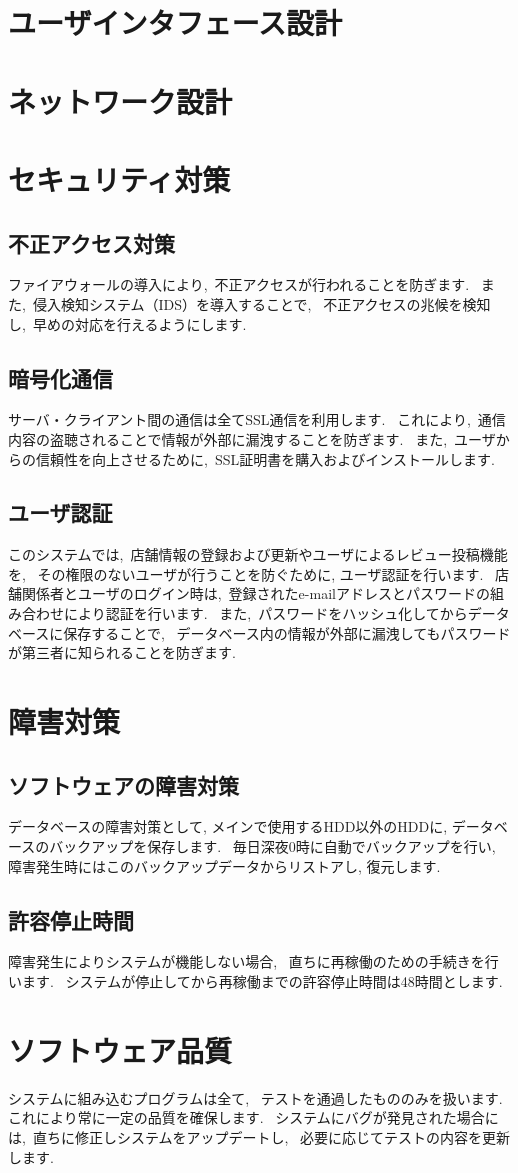\documentclass[a4j,titlepage]{jarticle}
\begin{document}
\section{ユーザインタフェース設計}

\section{ネットワーク設計}

\section{セキュリティ対策}
\subsection{不正アクセス対策}
ファイアウォールの導入により,~不正アクセスが行われることを防ぎます.~
また,~侵入検知システム（IDS）を導入することで,~
不正アクセスの兆候を検知し,~早めの対応を行えるようにします.~
\subsection{暗号化通信}
サーバ・クライアント間の通信は全てSSL通信を利用します.~
これにより,~通信内容の盗聴されることで情報が外部に漏洩することを防ぎます.~
また,~ユーザからの信頼性を向上させるために,~SSL証明書を購入およびインストールします.~
\subsection{ユーザ認証}
このシステムでは,~店舗情報の登録および更新やユーザによるレビュー投稿機能を,~
その権限のないユーザが行うことを防ぐために, ユーザ認証を行います.~
店舗関係者とユーザのログイン時は,~登録されたe-mailアドレスとパスワードの組み合わせにより認証を行います.~
また,~パスワードをハッシュ化してからデータベースに保存することで,~
データベース内の情報が外部に漏洩してもパスワードが第三者に知られることを防ぎます.~


\section{障害対策}
\subsection{ソフトウェアの障害対策}
データベースの障害対策として, メインで使用するHDD以外のHDDに,
データベースのバックアップを保存します.~
毎日深夜0時に自動でバックアップを行い,
障害発生時にはこのバックアップデータからリストアし, 復元します.~
\subsection{許容停止時間}
障害発生によりシステムが機能しない場合,~
直ちに再稼働のための手続きを行います.~
システムが停止してから再稼働までの許容停止時間は48時間とします.~

\section{ソフトウェア品質}
システムに組み込むプログラムは全て,~
テストを通過したもののみを扱います.~
これにより常に一定の品質を確保します.~
システムにバグが発見された場合には,~直ちに修正しシステムをアップデートし,~
必要に応じてテストの内容を更新します.~
\end{document}

